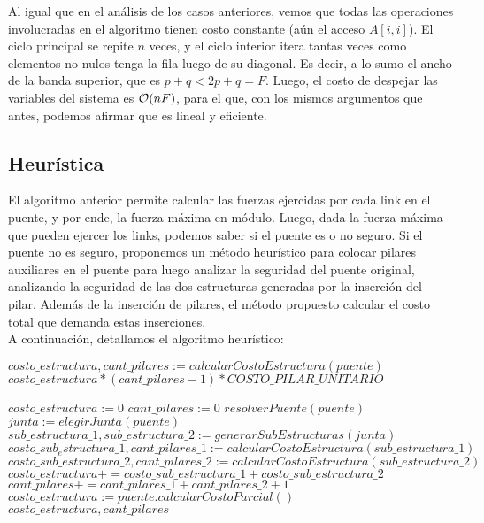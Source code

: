  Al igual que en el análisis de los casos anteriores, vemos que todas las operaciones involucradas en el algoritmo tienen costo constante (aún el acceso $A[i,i]$). El ciclo principal se repite $n$ veces, y el ciclo interior itera tantas veces como elementos no nulos tenga la fila luego de su diagonal. Es decir, a lo sumo el ancho de la banda superior, que es $p+q < 2p+q = F$. Luego, el costo de despejar las variables del sistema es $\mathcal{O}(nF)$, para el que, con los mismos argumentos que antes, podemos afirmar que es lineal y eficiente.
 
\subsection{Heurística}
  El algoritmo anterior permite calcular las fuerzas ejercidas por cada link en el puente, y por ende, la fuerza máxima en módulo. Luego, dada la fuerza máxima que pueden ejercer los links, podemos saber si el puente es o no seguro. Si el puente no es seguro, proponemos un método heurístico para colocar pilares auxiliares en el puente para luego analizar la seguridad del puente original, analizando la seguridad de las dos estructuras generadas por la inserción del pilar. Además de la inserción de pilares, el método propuesto calcular el costo total que demanda estas inserciones. \\
  
  A continuación, detallamos el algoritmo heurístico:
  
\begin{algorithm}[H]
\caption{$calcuarCostoTotal(puente)$}
\begin{algorithmic}
\State $costo\_estructura, cant\_pilares := calcularCostoEstructura(puente)$ \\
\Return $costo\_estructura * (cant\_pilares-1) * COSTO\_PILAR\_UNITARIO$
\end{algorithmic}
\end{algorithm}

\begin{algorithm}[H]
 \caption{$calcularCostoEstructura(puente)$}
 \begin{algorithmic}
  \State $costo\_estructura := 0$
  \State $cant\_pilares := 0$
  \State $resolverPuente(puente)$
    \State $junta := elegirJunta(puente)$
    \State $sub\_estructura\_1, sub\_estructura\_2 := generarSubEstructuras(junta)$
    \State $costo\_sub_estructura\_1, cant\_pilares\_1 := calcularCostoEstructura(sub\_estructura\_1)$
    \State $costo\_sub\_estructura\_2, cant\_pilares\_2 := calcularCostoEstructura(sub\_estructura\_2)$
    \State $costo\_estructura += costo\_sub\_estructura\_1+costo\_sub\_estructura\_2$
    \State $cant\_pilares += cant\_pilares\_1 + cant\_pilares\_2 + 1$
  \Else
    \State $costo\_estructura := puente.calcularCostoParcial()$
  \EndIf \\
  \Return $costo\_estructura, cant\_pilares$    
 \end{algorithmic}
\end{algorithm}

